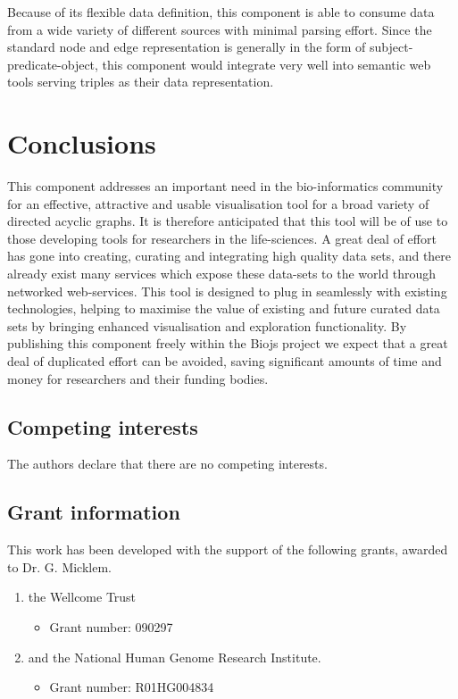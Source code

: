 \documentclass[10pt,a4paper,twocolumn]{article}
\begin{document}
Because of
its flexible data definition, this component is able to consume data from a wide
variety of different sources with minimal parsing effort. Since the standard
node and edge representation is generally in the form of
subject-predicate-object, this component would integrate very well into semantic
web tools serving triples as their data representation.

\section*{Conclusions} This component addresses an important need in the
bio-informatics community for an effective, attractive and usable visualisation
tool for a broad variety of directed acyclic graphs.  It is therefore
anticipated that this tool will be of use to those developing tools for
researchers in the life-sciences. A great deal of effort has gone into creating,
curating and integrating high quality data sets, and there already exist many
services which expose these data-sets to the world through networked
web-services. This tool is designed to plug in seamlessly with existing
technologies, helping to maximise the value of existing and future curated data
sets by bringing enhanced visualisation and exploration functionality.  By
publishing this component freely within the Biojs project we expect that a great
deal of duplicated effort can be avoided, saving significant amounts of time and
money for researchers and their funding bodies.

\subsection*{Competing interests}
The authors declare that there are no competing interests.

\subsection*{Grant information}
This work has been developed with the support of the following grants, awarded
to Dr. G. Micklem.

\begin{enumerate}
\item the Wellcome Trust
 \begin{itemize}
 \item{Grant number: 090297}
 \end{itemize}
\item and the National Human Genome Research Institute.
 \begin{itemize}
 \item{Grant number: R01HG004834}
 \end{itemize}
\end{enumerate}
\end{document}
